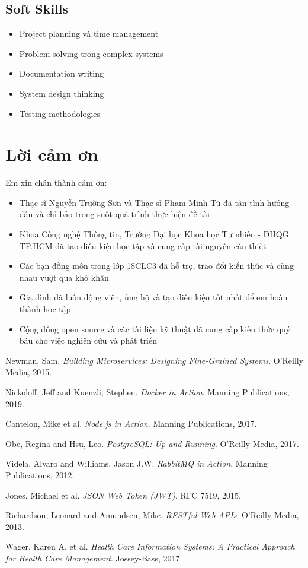 \documentclass[12pt,a4paper]{report}
\begin{document}
\subsection{Soft Skills}
\begin{itemize}
    \item Project planning và time management
    \item Problem-solving trong complex systems
    \item Documentation writing
    \item System design thinking
    \item Testing methodologies
\end{itemize}

\section{Lời cảm ơn}
Em xin chân thành cảm ơn:
\begin{itemize}
    \item Thạc sĩ Nguyễn Trường Sơn và Thạc sĩ Phạm Minh Tú đã tận tình hướng dẫn và chỉ bảo trong suốt quá trình thực hiện đề tài
    \item Khoa Công nghệ Thông tin, Trường Đại học Khoa học Tự nhiên - ĐHQG TP.HCM đã tạo điều kiện học tập và cung cấp tài nguyên cần thiết
    \item Các bạn đồng môn trong lớp 18CLC3 đã hỗ trợ, trao đổi kiến thức và cùng nhau vượt qua khó khăn
    \item Gia đình đã luôn động viên, ủng hộ và tạo điều kiện tốt nhất để em hoàn thành học tập
    \item Cộng đồng open source và các tài liệu kỹ thuật đã cung cấp kiến thức quý báu cho việc nghiên cứu và phát triển
\end{itemize}

\begin{thebibliography}{99}

Newman, Sam. \textit{Building Microservices: Designing Fine-Grained Systems}. O'Reilly Media, 2015.

Nickoloff, Jeff and Kuenzli, Stephen. \textit{Docker in Action}. Manning Publications, 2019.

Cantelon, Mike et al. \textit{Node.js in Action}. Manning Publications, 2017.

Obe, Regina and Hsu, Leo. \textit{PostgreSQL: Up and Running}. O'Reilly Media, 2017.

Videla, Alvaro and Williams, Jason J.W. \textit{RabbitMQ in Action}. Manning Publications, 2012.

Jones, Michael et al. \textit{JSON Web Token (JWT)}. RFC 7519, 2015.

Richardson, Leonard and Amundsen, Mike. \textit{RESTful Web APIs}. O'Reilly Media, 2013.

Wager, Karen A. et al. \textit{Health Care Information Systems: A Practical Approach for Health Care Management}. Jossey-Bass, 2017.

\end{thebibliography}
\end{document}
